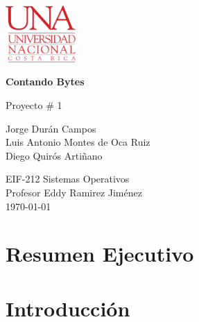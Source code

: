 \documentclass[10pt, article, natbib]{IEEEtran}
\begin{document}
\begin{titlepage}
	\includegraphics[width=0.2\textwidth]{./logo-UNA blanco.png}      
   	\begin{changemargin}{4.5cm}{0cm}
       	\textbf{\Huge Contando Bytes}

       	\vspace{0.2cm}
       	\LARGE Proyecto \# 1
            
       	\vspace{3cm}
		\Large
       	Jorge Durán Campos \\ 
       	Luis Antonio Montes de Oca Ruiz \\ 
       	Diego Quirós Artiñano \\ 

       	\vspace{3cm}
       
		EIF-212 Sistemas Operativos \\
       	Profesor Eddy Ramirez Jiménez \\
		       	
       	\vspace{3cm}
       	\today
	\end{changemargin}
\end{titlepage}

\onecolumn
    \renewcommand{\contentsname}{\large Índice \\ \hrulefill}
\tableofcontents
\setcounter{tocdepth}{2}
\newpage
 \renewcommand{\listfigurename}{\large Índice de fíguras \\ \hrulefill}
 \listoffigures
 \newpage
 \renewcommand{\listtablename}{\large Índice de tablas \\ \hrulefill}
 \listoftables
 \newpage


\section{Resumen Ejecutivo}

\newpage
\twocolumn
\section{Introducción}
\end{document}
